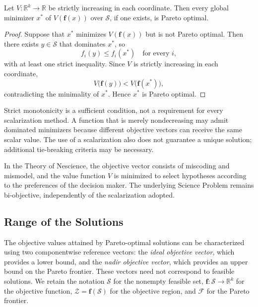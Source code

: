 \begin{proposition}
\label{prop:scalarization_pareto}
Let $V:\mathbb{R}^k\to\mathbb{R}$ be strictly increasing in each coordinate. Then every global minimizer $x^*$ of $V(\mathbf{f}(x))$ over $\mathcal{S}$, if one exists, is Pareto optimal.
\end{proposition}

\begin{proof}
Suppose that $x^*$ minimizes $V(\mathbf{f}(x))$ but is not Pareto optimal. Then there exists $y\in\mathcal{S}$ that dominates $x^*$, so
\[
f_i(y)\leq f_i(x^*)\quad\text{for every }i,
\]
with at least one strict inequality. Since $V$ is strictly increasing in each coordinate,
\[
V\bigl(\mathbf{f}(y)\bigr)<V\bigl(\mathbf{f}(x^*)\bigr),
\]
contradicting the minimality of $x^*$. Hence $x^*$ is Pareto optimal.
\end{proof}

Strict monotonicity is a sufficient condition, not a requirement for every scalarization method. A function that is merely nondecreasing may admit dominated minimizers because different objective vectors can receive the same scalar value. The use of a scalarization also does not guarantee a unique solution; additional tie-breaking criteria may be necessary.

In the Theory of Nescience, the objective vector consists of miscoding and mismodel, and the value function $V$ is minimized to select hypotheses according to the preferences of the decision maker. The underlying Science Problem remains bi-objective, independently of the scalarization adopted.


\subsection*{Range of the Solutions}
\label{sec:range_solutions}

The objective values attained by Pareto-optimal solutions can be characterized using two componentwise reference vectors: the \emph{ideal objective vector}, which provides a lower bound, and the \emph{nadir objective vector}, which provides an upper bound on the Pareto frontier. These vectors need not correspond to feasible solutions. We retain the notation $\mathcal{S}$ for the nonempty feasible set, $\mathbf{f}:\mathcal{S}\to\mathbb{R}^k$ for the objective function, $\mathcal{Z}=\mathbf{f}(\mathcal{S})$ for the objective region, and $\mathcal{F}$ for the Pareto frontier.

